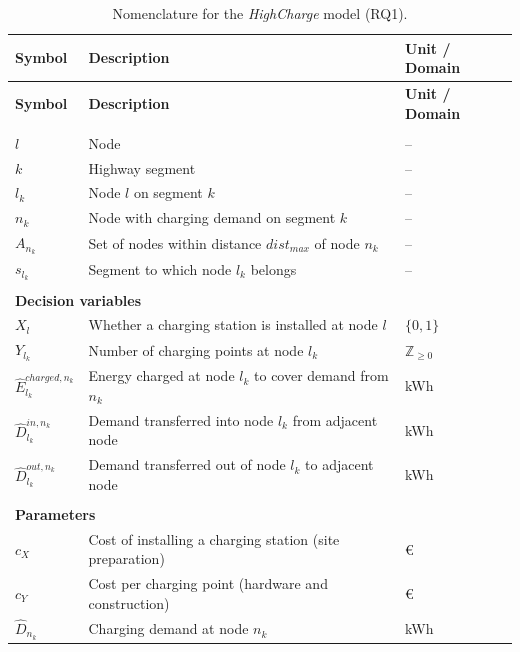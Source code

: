         \begin{scriptsize}
        \begin{longtable}{lll}
        \caption{Nomenclature for the \textit{HighCharge} model (RQ1).}
        \label{tab:nomenclature_rq1}\\
        \hline
        \textbf{Symbol} & \textbf{Description} & \textbf{Unit / Domain} \\ \hline
        \endfirsthead
        \hline
        \textbf{Symbol} & \textbf{Description} & \textbf{Unit / Domain} \\ \hline
        \endhead
        \hline
        \endfoot
        \endlastfoot
        \multicolumn{3}{l}{\textbf{Sets and indices}} \\ \hline
        $l$ & Node & -- \\
        $k$ & Highway segment & -- \\
        $l_k$ & Node $l$ on segment $k$ & -- \\
        $n_k$ & Node with charging demand on segment $k$ & -- \\
        $A_{n_k}$ & Set of nodes within distance $dist_{max}$ of node $n_k$ & -- \\
        $s_{l_k}$ & Segment to which node $l_k$ belongs & -- \\
        \\ \hline
        \multicolumn{3}{l}{\textbf{Decision variables}} \\ \hline
        $X_l$ & Whether a charging station is installed at node $l$ & $\{0,1\}$ \\
        $Y_{l_k}$ & Number of charging points at node $l_k$ & $\mathbb{Z}_{\geq 0}$ \\
        $\hat{E}_{l_k}^{charged, n_k}$ & Energy charged at node $l_k$ to cover demand from $n_k$ & kWh \\
        $\hat{D}_{l_k}^{in, n_k}$ & Demand transferred into node $l_k$ from adjacent node & kWh \\
        $\hat{D}_{l_k}^{out, n_k}$ & Demand transferred out of node $l_k$ to adjacent node & kWh \\
        \\ \hline
        \multicolumn{3}{l}{\textbf{Parameters}} \\ \hline
        $c_X$ & Cost of installing a charging station (site preparation) & \euro \\
        $c_Y$ & Cost per charging point (hardware and construction) & \euro \\
        $\hat{D}_{n_k}$ & Charging demand at node $n_k$ & kWh \\

\end{longtable}
\end{scriptsize}
